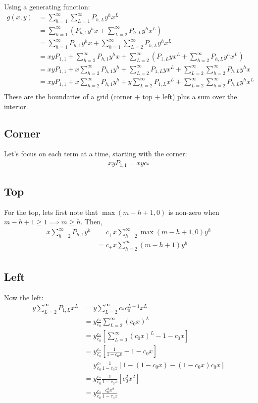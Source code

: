 	Using a generating function:
	\begin{align}
		g(x, y) &= \sum_{h=1}^\infty\sum_{L=1}^\infty P_{h, L} y^h x^L \\
		&= \sum_{h=1}^\infty\left(P_{h, 1} y^h x + \sum_{L=2}^\infty P_{h, L} y^h x^L \right)\\
		&= \sum_{h=1}^\infty P_{h, 1} y^h x + \sum_{h=1}^\infty\sum_{L=2}^\infty P_{h, L} y^h x^L\\
		&= xyP_{1, 1} + \sum_{h=2}^\infty P_{h, 1} y^h x + \sum_{L=2}^\infty\left( P_{1,L} yx^L + \sum_{h=2}^\infty P_{h, L} y^h x^L \right)\\
		&= xyP_{1, 1}  + x\sum_{h=2}^\infty P_{h, 1} y^h + \sum_{L=2}^\infty P_{1,L} yx^L + \sum_{L=2}^\infty\sum_{h=2}^\infty P_{h, L} y^h x \\
		&= xyP_{1, 1}  + x\sum_{h=2}^\infty P_{h, 1} y^h  + y\sum_{L=2}^\infty P_{1,L} x^L + \sum_{L=2}^\infty\sum_{h=2}^\infty P_{h, L} y^hx^L \\
	\end{align}
	These are the boundaries of a grid (corner $+$ top $+$ left) plus a sum over the interior. 

	\subsection{Corner} 
	Let's focus on each term at a time, starting with the corner:
	\begin{align}
		xyP_{1, 1} = xyc_*
	\end{align}
	\subsection{Top}
	For the top, lets first note that $\max(m - h + 1, 0)$ is non-zero when $m - h + 1 \ge 1 \implies m \ge h$. Then,
	\begin{align}
		x\sum_{h=2}^\infty P_{h, 1} y^h &= c_+x \sum_{h=2}^\infty\max(m - h + 1, 0)y^h\\
		&= c_+x \sum_{h=2}^m (m - h + 1)y^h\\
	\end{align}
	\subsection{Left}
	Now the left:
	\begin{align}
		y\sum_{L=2}^\infty P_{1,L} x^L &= y\sum_{L=2}^\infty c_* c_0^{L-1} x^L \\
		&= y\frac{c_*}{c_0}\sum_{L=2}^\infty (c_0x)^L \\
		&= y\frac{c_*}{c_0}\left[\sum_{L=0}^\infty (c_0x)^L - 1 - c_0x\right]\\
		&= y\frac{c_*}{c_0}\left[\frac{1}{1-c_0x} - 1 - c_0x\right]\\
		&= y\frac{c_*}{c_0}\frac{1}{1-c_0x}\left[1 - (1-c_0x) - (1-c_0x)c_0x\right]\\
		&= y\frac{c_*}{c_0}\frac{1}{1-c_0x}\left[c_0^2x^2\right]\\
		&= y\frac{c_*}{c_0}\frac{c_0^2x^2}{1-c_0x}\\
	\end{align}
